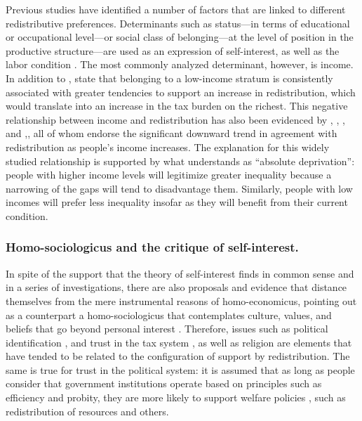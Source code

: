 \documentclass[utf8]{frontiersSCNS} %
\begin{document}
Previous studies have identified a number of factors that are linked to different redistributive preferences. Determinants such as status—in terms of educational or occupational level—or social class of belonging—at the level of position in the productive structure—are used as an expression of self-interest, as well as the labor condition \parencite{GijsbertsLegitimationIncomeInequality2002}. The most commonly analyzed determinant, however, is income. In addition to \textcite{MeltzerRationalTheorySize1981}, \textcite{FrankoInequalitySelfInterestPublic2013} state that belonging to a low-income stratum is consistently associated with greater tendencies to support an increase in redistribution, which would translate into an increase in the tax burden on the richest. This negative relationship between income and redistribution has also been evidenced by \textcite{BernasconiRedistributivetaxationdemocracies2006}, \textcite{IversenCapitalismDemocracyWelfare2005}, \textcite{JaegerWelfarestateregimes2005, JaegerWelfareRegimesAttitudes2006}, and \textcite{FinseraasIncomeInequalityDemand2009},, all of whom endorse the significant downward trend in agreement with redistribution as people’s income increases. The explanation for this widely studied relationship is supported by what \textcite{SzirmaiInequalityobserved1986} understands as “absolute deprivation”: people with higher income levels will legitimize greater inequality because a narrowing of the gaps will tend to disadvantage them. Similarly, people with low incomes will prefer less inequality insofar as they will benefit from their current condition.

\subsubsection{Homo-sociologicus and the critique of self-interest.}

In spite of the support that the theory of self-interest finds in common sense and in a series of investigations, there are also proposals and evidence that distance themselves from the mere instrumental reasons of homo-economicus, pointing out as a counterpart a homo-sociologicus that contemplates culture, values, and beliefs that go beyond personal interest \parencite{etzioni1988moral, FeldmanPoliticalCultureAmbivalence1992}. Therefore, issues such as political identification \parencite{CastilloClivajespartidarioscambios2013}, and trust in the tax system \parencite{AlmCultureDifferencesTax2006}, as well as religion \parencite{ScheveReligionPreferencesSocial2006} are elements that have tended to be related to the configuration of support by redistribution. The same is true for trust in the political system: it is assumed that as long as people consider that government institutions operate based on principles such as efficiency and probity, they are more likely to support welfare policies \parencite{KumlinPersonalPolitical2004}, such as redistribution of resources and others.
\end{document}
